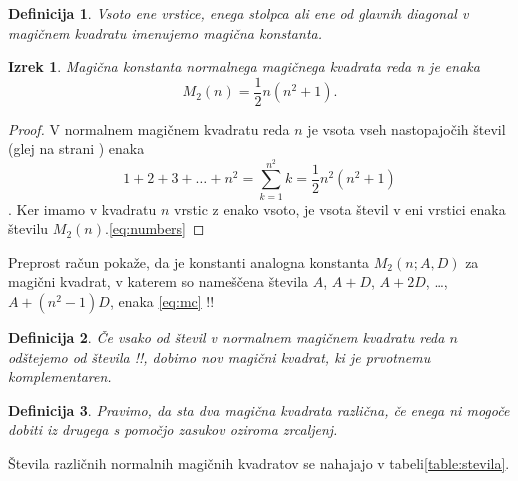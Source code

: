 \documentclass[a4paper,12pt]{article}
\newtheorem{definicija}{Definicija}
\newtheorem{izrek}{Izrek}
\begin{document}
\begin{definicija}
   \label{definicija}
      Vsoto ene vrstice, enega stolpca ali ene od glavnih diagonal
      v magičnem kvadratu imenujemo \emph{magična konstanta}.
\end{definicija}


   
   \begin{izrek}
      Magična konstanta normalnega magičnega kvadrata reda n je enaka 
      \[
      \label{eq:mc}
      M_2(n) = \frac{1}{2}n(n^2+1).
      \]
   \end{izrek}

   \begin{proof}
      V normalnem magičnem kvadratu reda \(n\) je vsota vseh nastopajočih
      števil (glej \pageref na strani \pageref) enaka
      \[
         1 + 2 + 3 +\ldots + n^2=\sum_{k=1}^{n^2}k=\frac{1}{2} n^2(n^2+1)
      \]
      . Ker imamo
      v kvadratu \(n\) vrstic z enako vsoto, je vsota števil v eni vrstici
      enaka številu \(M_2(n)\).\eqref{eq:numbers} %
   \end{proof}

Preprost račun pokaže, da je konstanti \pageref analogna konstanta
\(M_2(n;A,D)\) za magični kvadrat, v katerem so nameščena števila
\(A\), \(A+D\), \(A+2D\), \ldots, \(A+(n^2-1)D\), enaka \eqref{eq:mc}%
!!


\begin{definicija}
      \label{definicija}
      Če vsako od števil v normalnem magičnem kvadratu reda \(n\) odštejemo
      od števila !!, dobimo nov magični kvadrat, ki je prvotnemu
      \emph{komplementaren}.
\end{definicija}


   \begin{definicija}
      \label{definicija}
      Pravimo, da sta dva magična kvadrata \emph{različna}, če enega ni mogoče dobiti
      iz drugega s pomočjo zasukov oziroma zrcaljenj.
   \end{definicija}


Števila različnih normalnih magičnih kvadratov se nahajajo v tabeli\ref{table:stevila}.
\end{document}
